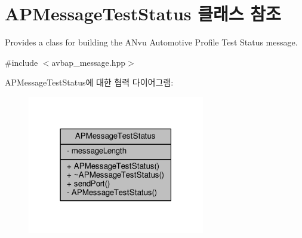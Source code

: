 \hypertarget{class_a_p_message_test_status}{}\section{A\+P\+Message\+Test\+Status 클래스 참조}
\label{class_a_p_message_test_status}


Provides a class for building the A\+Nvu Automotive Profile Test Status message.  




{\ttfamily \#include $<$avbap\+\_\+message.\+hpp$>$}



A\+P\+Message\+Test\+Status에 대한 협력 다이어그램\+:
\nopagebreak
\begin{figure}[H]
\begin{center}
\leavevmode
\includegraphics[width=219pt]{class_a_p_message_test_status__coll__graph}
\end{center}
\end{figure}
